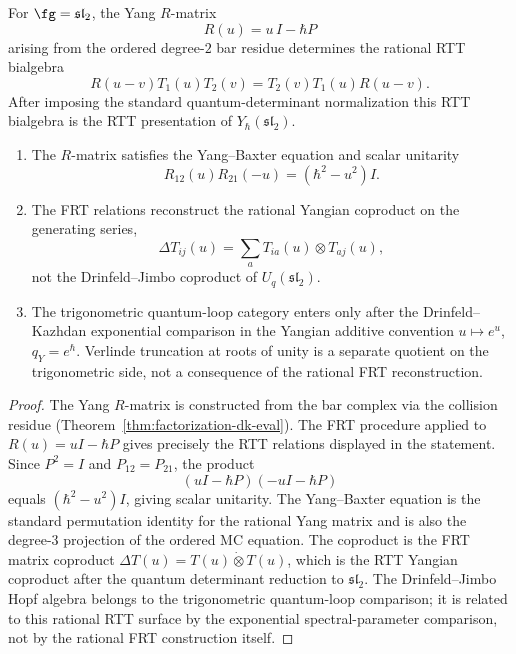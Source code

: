 \begin{proposition}
\label{prop:dk5-sl2-frt}
For $\fg = \mathfrak{sl}_2$, the Yang $R$-matrix
\[
R(u)=u\,I-\hbar P
\]
arising from the ordered degree-$2$ bar residue determines the
rational RTT bialgebra
\[
R(u-v)T_1(u)T_2(v)=T_2(v)T_1(u)R(u-v).
\]
After imposing the standard quantum-determinant normalization this
RTT bialgebra is the RTT presentation of
$Y_\hbar(\mathfrak{sl}_2)$.
\begin{enumerate}[label=\textup{(\roman*)}]
\item The $R$-matrix satisfies the Yang--Baxter equation and
 scalar unitarity
 \[
 R_{12}(u)R_{21}(-u)=(\hbar^2-u^2)I.
 \]
\item The FRT relations reconstruct the rational Yangian
 coproduct on the generating series,
 \[
 \Delta T_{ij}(u)=\sum_a T_{ia}(u)\otimes T_{aj}(u),
 \]
 not the Drinfeld--Jimbo coproduct of $U_q(\mathfrak{sl}_2)$.
\item The trigonometric quantum-loop category enters only after the
 Drinfeld--Kazhdan exponential comparison in the Yangian additive
 convention
 $u\mapsto e^u$, $q_Y=e^\hbar$. Verlinde truncation at roots of
 unity is a separate quotient on the trigonometric side, not a
 consequence of the rational FRT reconstruction.
\end{enumerate}
\end{proposition}

\begin{proof}
The Yang $R$-matrix is constructed from the bar complex
via the collision residue
(Theorem~\ref{thm:factorization-dk-eval}). The FRT
procedure applied to $R(u)=uI-\hbar P$ gives precisely the
RTT relations displayed in the statement. Since $P^2=I$ and
$P_{12}=P_{21}$, the product
\[
(uI-\hbar P)(-uI-\hbar P)
\]
equals $(\hbar^2-u^2)I$, giving scalar unitarity. The Yang--Baxter
equation is the standard permutation identity for the rational Yang
matrix and is also the degree-$3$ projection of the ordered MC equation.
The coproduct is the FRT matrix coproduct
$\Delta T(u)=T(u)\dot\otimes T(u)$, which is the RTT Yangian
coproduct after the quantum determinant reduction to
$\mathfrak{sl}_2$. The Drinfeld--Jimbo Hopf algebra belongs to the
trigonometric quantum-loop comparison; it is related to this rational
RTT surface by the exponential spectral-parameter comparison, not by
the rational FRT construction itself.
\end{proof}

